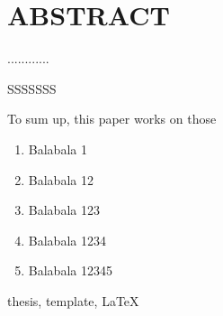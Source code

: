 \renewcommand{\baselinestretch}{1.5}
\fontsize{12pt}{13pt}\selectfont

\chapter[ABSTRACT(英文摘要)]{ABSTRACT}

\noindent ............

\noindent SSSSSSS

\noindent To sum up, this paper works on those
\vspace{-12pt}
\begin{enumerate} \setlength{\itemsep}{0pt}
	\item Balabala 1
	\item Balabala 12
	\item Balabala 123
	\item Balabala 1234
	\item Balabala 12345
\end{enumerate}
\vspace{-12pt}


\vspace{1em}
 \quad thesis, template, \LaTeX

\clearpage
\endinput